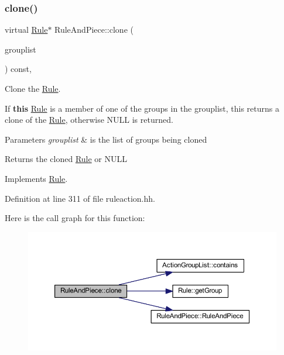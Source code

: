 \subsubsection{\texorpdfstring{clone()}{clone()}}
{\footnotesize\ttfamily virtual \mbox{\hyperlink{class_rule}{Rule}}$\ast$ Rule\+And\+Piece\+::clone (\begin{DoxyParamCaption}\item[{const \mbox{\hyperlink{class_action_group_list}{Action\+Group\+List}} \&}]{grouplist }\end{DoxyParamCaption}) const\hspace{0.3cm}{\ttfamily [inline]}, {\ttfamily [virtual]}}



Clone the \mbox{\hyperlink{class_rule}{Rule}}. 

If {\bfseries{this}} \mbox{\hyperlink{class_rule}{Rule}} is a member of one of the groups in the grouplist, this returns a clone of the \mbox{\hyperlink{class_rule}{Rule}}, otherwise N\+U\+LL is returned. 
\begin{DoxyParams}{Parameters}
{\em grouplist} & is the list of groups being cloned \\
\hline
\end{DoxyParams}
\begin{DoxyReturn}{Returns}
the cloned \mbox{\hyperlink{class_rule}{Rule}} or N\+U\+LL 
\end{DoxyReturn}


Implements \mbox{\hyperlink{class_rule_a70de90a76461bfa7ea0b575ce3c11e4d}{Rule}}.



Definition at line 311 of file ruleaction.\+hh.

Here is the call graph for this function\+:
\nopagebreak
\begin{figure}[H]
\begin{center}
\leavevmode
\includegraphics[width=350pt]{class_rule_and_piece_a7cdade8a979293fcc0cfd74888e93b12_cgraph}
\end{center}
\end{figure}
\mbox{\label{class_rule_and_piece_a51c57ede577ae45bdd82953dbc31ce3d}} 
